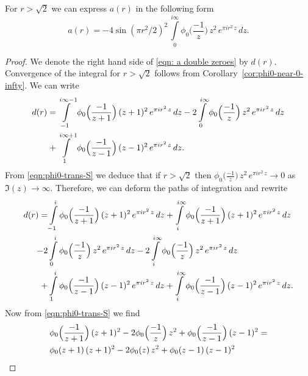 \begin{proposition}\label{prop:a-double-zeros}\leanok
For $r>\sqrt{2}$ we can express $a(r)$ in the following form
\begin{equation}\label{eqn: a double zeroes}
    a(r)=-4\sin(\pi r^2/2)^2\,\int\limits_{0}^{i\infty}\phi_0\Big(\frac{-1}{z}\Big)\,z^2\,e^{\pi i r^2 \,z}\,dz.
\end{equation}
\end{proposition}
\begin{proof}\leanok
We denote the right hand side of \eqref{eqn: a double zeroes} by $d(r)$.
Convergence of the integral for $r > \sqrt{2}$ follows from Corollary~\ref{cor:phi0-near-0-infty}.
We can write %
\begin{align}
    d(r)=&\int\limits_{-1}^{i\infty-1}\phi_0\Big(\frac{-1}{z+1}\Big)\,(z+1)^2\,e^{\pi i r^2 \,z}\,dz-
    2\int\limits_{0}^{i\infty}\phi_0\Big(\frac{-1}{z}\Big)\,z^2\,e^{\pi i r^2 \,z}\,dz\notag\\
    +&\int\limits_{1}^{i\infty+1}\phi_0\Big(\frac{-1}{z-1}\Big)\,(z-1)^2\,e^{\pi i r^2 \,z}\,dz.\notag
\end{align}
From \eqref{eqn:phi0-trans-S} we deduce that if $r>\sqrt{2}$ then
$\phi_0\Big(\frac{-1}{z}\Big)\,z^2\,e^{\pi i r^2 \,z}\to 0$ as $\Im(z)\to\infty$. Therefore, we can deform the paths of integration
and rewrite
\begin{align}
    d(r)=&\int\limits_{-1}^{i}\phi_0\Big(\frac{-1}{z+1}\Big)\,(z+1)^2\,e^{\pi i r^2 \,z}\,dz
    +\int\limits_{i}^{i\infty}\phi_0\Big(\frac{-1}{z+1}\Big)\,(z+1)^2\,e^{\pi i r^2 \,z}\,dz\notag\\
    -2&\int\limits_{0}^{i}\phi_0\Big(\frac{-1}{z}\Big)\,z^2\,e^{\pi i r^2 \,z}\,dz
    -2\int\limits_{i}^{i\infty}\phi_0\Big(\frac{-1}{z}\Big)\,z^2\,e^{\pi i r^2 \,z}\,dz\notag\\
    +&\int\limits_{1}^{i}\phi_0\Big(\frac{-1}{z-1}\Big)\,(z-1)^2\,e^{\pi i r^2 \,z}\,dz
    +\int\limits_{i}^{i\infty}\phi_0\Big(\frac{-1}{z-1}\Big)\,(z-1)^2\,e^{\pi i r^2 \,z}\,dz.\notag
\end{align}
Now from \eqref{eqn:phi0-trans-S} we find
\begin{align}&\phi_0\Big(\frac{-1}{z+1}\Big)\,(z+1)^2-2\phi_0\Big(\frac{-1}{z}\Big)\,z^2+
\phi_0\Big(\frac{-1}{z-1}\Big)\,(z-1)^2=\notag\\
&\phi_0(z+1)\,(z+1)^2-2\phi_0(z)\,z^2+\phi_0(z-1)\,(z-1)^2\notag\\

\end{align}
\end{proof}
